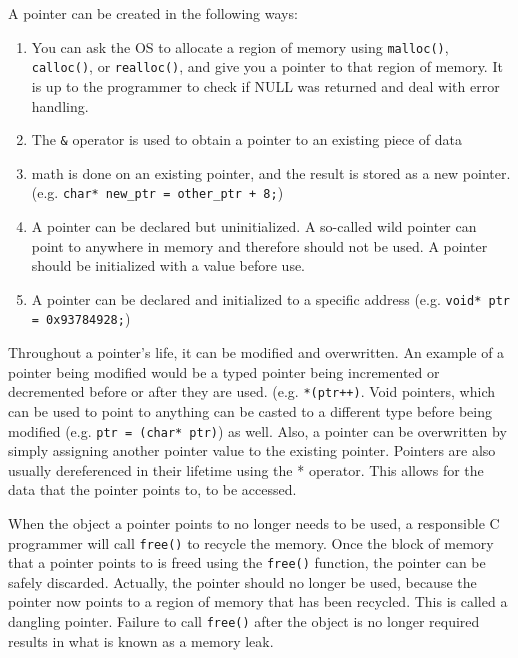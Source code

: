 A pointer can be created in the following ways:
\begin{enumerate}
  \item You can ask the OS to allocate a region of
    memory using \texttt{malloc()}, \texttt{calloc()}, or \texttt{realloc()},
    and give you a pointer to that region of memory. It is up to the programmer
    to check if NULL was returned and deal with error handling.
  \item The \texttt{\&} operator is used to obtain a pointer to an existing
    piece of data
  \item math is done on an existing pointer, and the result is stored as a new
    pointer. (e.g. \texttt{char* new\_ptr = other\_ptr + 8;})
  \item A pointer can be declared but uninitialized. A so-called wild pointer
    can point to anywhere in memory and therefore should not be used. A pointer
    should be initialized with a value before use.
  \item A pointer can be declared and initialized to a specific address (e.g.
    \texttt{void* ptr = 0x93784928;})
\end{enumerate}

Throughout a pointer's life, it can be modified and overwritten. An example of a
pointer being modified would be a typed pointer being incremented or decremented
before or after they are used. (e.g. \texttt{*(ptr++)}.  Void pointers, which
can be used to point to anything can be casted to a different type before being
modified (e.g. \texttt{ptr = (char* ptr)}) as well. Also, a pointer can be
overwritten by simply assigning another pointer value to the existing pointer.
Pointers are also usually dereferenced in their lifetime using the * operator.
This allows for the data that the pointer points to, to be accessed. 

When the object a pointer points to no longer needs to be used, a responsible C
programmer will call \texttt{free()} to recycle the memory.  Once the block of
memory that a pointer points to is freed using the \texttt{free()} function, the
pointer can be safely discarded. Actually, the pointer should no longer be used,
because the pointer now points to a region of memory that has been recycled.
This is called a dangling pointer. Failure to call \texttt{free()} after the
object is no longer required results in what is known as a memory leak.


